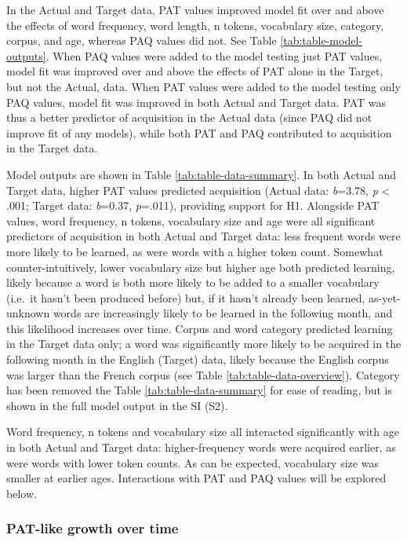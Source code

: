 \documentclass[
  man,mask,floatsintext]{apa6}
\begin{document}
In the Actual and Target data, PAT values improved model fit over and above the effects of word frequency, word length, n tokens, vocabulary size, category, corpus, and age, whereas PAQ values did not. See Table \ref{tab:table-model-outputs}. When PAQ values were added to the model testing just PAT values, model fit was improved over and above the effects of PAT alone in the Target, but not the Actual, data. When PAT values were added to the model testing only PAQ values, model fit was improved in both Actual and Target data. PAT was thus a better predictor of acquisition in the Actual data (since PAQ did not improve fit of any models), while both PAT and PAQ contributed to acquisition in the Target data.

Model outputs are shown in Table \ref{tab:table-data-summary}. In both Actual and Target data, higher PAT values predicted acquisition (Actual data: \emph{b}=3.78, \emph{p} \textless{} .001; Target data: \emph{b}=0.37, \emph{p}=.011), providing support for H1. Alongside PAT values, word frequency, n tokens, vocabulary size and age were all significant predictors of acquisition in both Actual and Target data: less frequent words were more likely to be learned, as were words with a higher token count. Somewhat counter-intuitively, lower vocabulary size but higher age both predicted learning, likely because a word is both more likely to be added to a smaller vocabulary (i.e.~it hasn't been produced before) but, if it hasn't already been learned, as-yet-unknown words are increasingly likely to be learned in the following month, and this likelihood increases over time. Corpus and word category predicted learning in the Target data only; a word was significantly more likely to be acquired in the following month in the English (Target) data, likely because the English corpus was larger than the French corpus (see Table \ref{tab:table-data-overview}). Category has been removed the Table \ref{tab:table-data-summary} for ease of reading, but is shown in the full model output in the SI (S2).

Word frequency, n tokens and vocabulary size all interacted significantly with age in both Actual and Target data: higher-frequency words were acquired earlier, as were words with lower token counts. As can be expected, vocabulary size was smaller at earlier ages. Interactions with PAT and PAQ values will be explored below.

\hypertarget{pat-like-growth-over-time}{%
\subsubsection{PAT-like growth over time}\label{pat-like-growth-over-time}}
\end{document}

